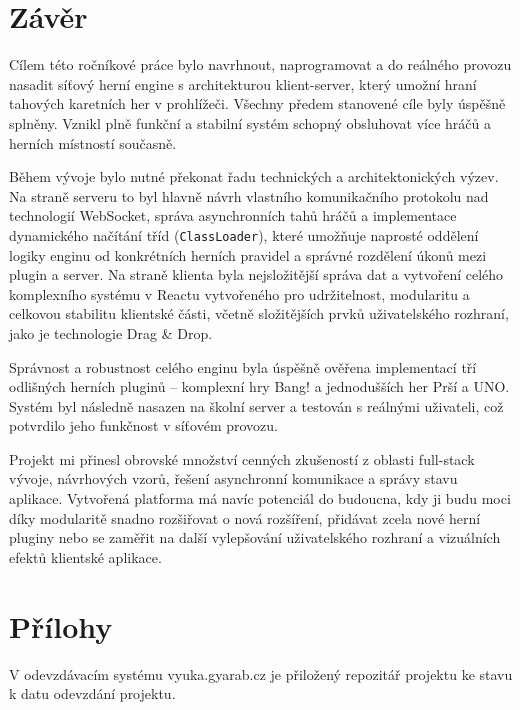 \section{Závěr}

Cílem této ročníkové práce bylo navrhnout, naprogramovat a do reálného provozu nasadit síťový herní engine s architekturou klient-server, který umožní hraní tahových karetních her v prohlížeči. Všechny předem stanovené cíle byly úspěšně splněny. Vznikl plně funkční a stabilní systém schopný obsluhovat více hráčů a herních místností současně.

Během vývoje bylo nutné překonat řadu technických a architektonických výzev. Na straně serveru to byl hlavně návrh vlastního komunikačního protokolu nad technologií WebSocket, správa asynchronních tahů hráčů a implementace dynamického načítání tříd (\texttt{ClassLoader}), které umožňuje naprosté oddělení logiky enginu od konkrétních herních pravidel a správné rozdělení úkonů mezi plugin a server. Na straně klienta byla nejsložitější správa dat a vytvoření celého komplexního systému v Reactu vytvořeného pro udržitelnost, modularitu a celkovou stabilitu klientské části, včetně složitějších prvků uživatelského rozhraní, jako je technologie Drag \& Drop.

Správnost a robustnost celého enginu byla úspěšně ověřena implementací tří odlišných herních pluginů -- komplexní hry Bang! a jednodušších her Prší a UNO. Systém byl následně nasazen na školní server a testován s reálnými uživateli, což potvrdilo jeho funkčnost v síťovém provozu.

Projekt mi přinesl obrovské množství cenných zkušeností z oblasti full-stack vývoje, návrhových vzorů, řešení asynchronní komunikace a správy stavu aplikace. Vytvořená platforma má navíc potenciál do budoucna, kdy ji budu moci díky modularitě snadno rozšiřovat o nová rozšíření, přidávat zcela nové herní pluginy nebo se zaměřit na další vylepšování uživatelského rozhraní a vizuálních efektů klientské aplikace.
\section{Přílohy}
V odevzdávacím systému vyuka.gyarab.cz je přiložený repozitář projektu ke stavu k datu odevzdání projektu.


\nocite{*}

